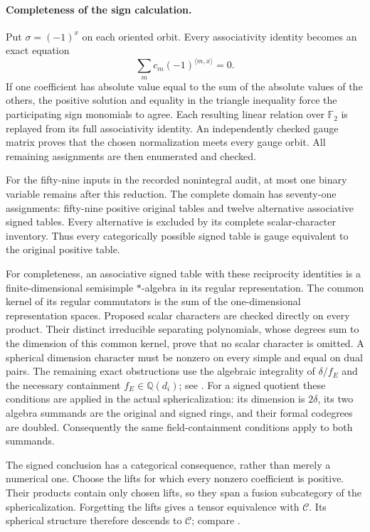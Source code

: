 \paragraph{Completeness of the sign calculation.}
Put $\sigma=(-1)^x$ on each oriented orbit. Every associativity identity
becomes an exact equation
\[
 \sum_m c_m(-1)^{\langle m,x\rangle}=0.
\]
If one coefficient has absolute value equal to the sum of the absolute
values of the others, the positive solution and equality in the triangle
inequality force the participating sign monomials to agree. Each resulting
linear relation over $\mathbb F_2$ is replayed from its full associativity
identity. An independently checked gauge matrix proves that the chosen
normalization meets every gauge orbit. All remaining assignments are then
enumerated and checked.

For the fifty-nine inputs in the recorded nonintegral audit, at most one
binary variable remains after this reduction. The complete domain has
seventy-one assignments: fifty-nine positive original tables and twelve
alternative associative signed tables. Every alternative is excluded by
its complete scalar-character inventory. Thus every categorically possible
signed table is gauge equivalent to the original positive table.

For completeness, an associative signed table with these reciprocity
identities is a finite-dimensional semisimple $*$-algebra in its regular
representation. The common kernel of its regular commutators is the sum
of the one-dimensional representation spaces. Proposed scalar characters
are checked directly on every product. Their distinct irreducible
separating polynomials, whose degrees sum to the dimension of this common
kernel, prove that no scalar character is omitted. A spherical dimension
character must be nonzero on every simple and equal on dual pairs. The
remaining exact obstructions use the algebraic integrality of
$\delta/f_E$ and the necessary containment
$f_E\in\mathbb Q(d_i)$; see
\cite[Theorem~2.13 and Corollary~2.15]{OstrikPivotal}.
For a signed quotient these conditions are applied in the actual
sphericalization: its dimension is $2\delta$, its two algebra summands
are the original and signed rings, and their formal codegrees are doubled.
Consequently the same field-containment conditions apply to both summands.

The signed conclusion has a categorical consequence, rather than merely
a numerical one. Choose the lifts for which every nonzero coefficient is
positive. Their products contain only chosen lifts, so they span a fusion
subcategory of the sphericalization. Forgetting the lifts gives a tensor
equivalence with $\mathcal C$. Its spherical structure therefore descends
to $\mathcal C$; compare \cite[Section~5.1]{OstrikPivotal}.

